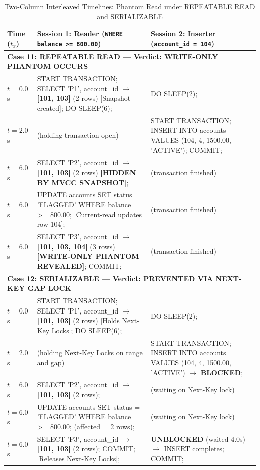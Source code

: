 \documentclass[sigconf, pbalance, nonacm]{acmart}
\begin{document}
\begin{table}[t]
\centering
\small
\caption{Two-Column Interleaved Timelines: Phantom Read under REPEATABLE READ and SERIALIZABLE}
\label{tab:phantom_rr_ser}
\begin{tabularx}{\textwidth}{p{1.8cm} X X}
\toprule
\textbf{Time ($t_x$)} & \textbf{Session 1: Reader (\texttt{WHERE balance >= 800.00})} & \textbf{Session 2: Inserter (\texttt{account\_id = 104})} \\
\midrule
\multicolumn{3}{l}{\textbf{Case 11: REPEATABLE READ --- Verdict: WRITE-ONLY PHANTOM OCCURS}} \\
$t = 0.0$s & START TRANSACTION; SELECT 'P1', account\_id $\rightarrow$ \textbf{[101, 103]} (2 rows) [Snapshot created]; DO SLEEP(6); & DO SLEEP(2); \\
$t = 2.0$s & (holding transaction open) & START TRANSACTION; INSERT INTO accounts VALUES (104, 4, 1500.00, 'ACTIVE'); COMMIT; \\
$t = 6.0$s & SELECT 'P2', account\_id $\rightarrow$ \textbf{[101, 103]} (2 rows) \textbf{[HIDDEN BY MVCC SNAPSHOT]}; & (transaction finished) \\
$t = 6.0$s & UPDATE accounts SET status = 'FLAGGED' WHERE balance >= 800.00; [Current-read updates row 104]; & (transaction finished) \\
$t = 6.0$s & SELECT 'P3', account\_id $\rightarrow$ \textbf{[101, 103, 104]} (3 rows) \textbf{[WRITE-ONLY PHANTOM REVEALED]}; COMMIT; & (transaction finished) \\
\midrule
\multicolumn{3}{l}{\textbf{Case 12: SERIALIZABLE --- Verdict: PREVENTED VIA NEXT-KEY GAP LOCK}} \\
$t = 0.0$s & START TRANSACTION; SELECT 'P1', account\_id $\rightarrow$ \textbf{[101, 103]} (2 rows) [Holds Next-Key Locks]; DO SLEEP(6); & DO SLEEP(2); \\
$t = 2.0$s & (holding Next-Key Locks on range and gap) & START TRANSACTION; INSERT INTO accounts VALUES (104, 4, 1500.00, 'ACTIVE') $\rightarrow$ \textbf{BLOCKED}; \\
$t = 6.0$s & SELECT 'P2', account\_id $\rightarrow$ \textbf{[101, 103]} (2 rows); & (waiting on Next-Key lock) \\
$t = 6.0$s & UPDATE accounts SET status = 'FLAGGED' WHERE balance >= 800.00; (affected = 2 rows); & (waiting on Next-Key lock) \\
$t = 6.0$s & SELECT 'P3', account\_id $\rightarrow$ \textbf{[101, 103]} (2 rows); COMMIT; [Releases Next-Key Locks]; & \textbf{UNBLOCKED} (waited 4.0s) $\rightarrow$ INSERT completes; COMMIT; \\
\bottomrule
\end{tabularx}
\end{table}
\end{document}
